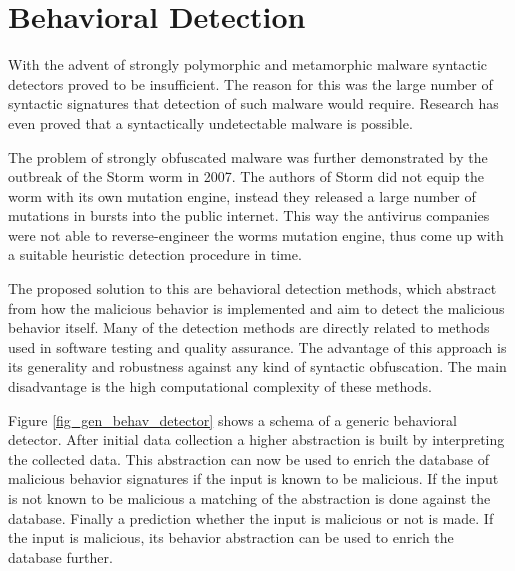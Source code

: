 \section{Behavioral Detection}
\label{s_behav_det}
With the advent of strongly polymorphic and metamorphic malware syntactic detectors proved to be insufficient. The reason for this was the large number of syntactic signatures that detection of such malware would require. Research has even proved that a syntactically undetectable malware is possible\cite{Filiol07}. 

The problem of strongly obfuscated malware was further demonstrated by the outbreak of the Storm worm in 2007. The authors of Storm did not equip the worm with its own mutation engine, instead they released a large number of mutations in bursts into the public internet. This way the antivirus companies were not able to reverse-engineer the worms mutation engine, thus come up with a suitable heuristic detection procedure in time.

The proposed solution to this are behavioral detection methods, which abstract from how the malicious behavior is implemented and aim to detect the malicious behavior itself. Many of the detection methods are directly related to methods used in software testing and quality assurance. The advantage of this approach is its generality and robustness against any kind of syntactic obfuscation. The main disadvantage is the high computational complexity of these methods. 

Figure \ref{fig_gen_behav_detector} shows a schema of a generic behavioral detector. After initial data collection a higher abstraction is built by interpreting the collected data. This abstraction can now be used to enrich the database of malicious behavior signatures if the input is known to be malicious. If the input is not known to be malicious a matching of the abstraction is done against the database. Finally a prediction whether the input is malicious or not is made. If the input is malicious, its behavior abstraction can be used to enrich the database further.

